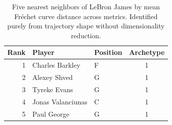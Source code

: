 \begin{table}[htbp]
  \centering\small
  \begin{tabular}{rllc}
    \toprule
    Rank & Player & Position & Archetype \\
    \midrule
    1 & Charles Barkley & F & 1 \\
    2 & Alexey Shved & G & 1 \\
    3 & Tyreke Evans & G & 1 \\
    4 & Jonas Valanciunas & C & 1 \\
    5 & Paul George & G & 1 \\
    \bottomrule
  \end{tabular}
  \caption{Five nearest neighbors of LeBron James by mean Fr\'{e}chet curve distance across metrics. Identified purely from trajectory shape without dimensionality reduction.}
  \label{tab:LeBron_James_frechet_curve_neighbors}
\end{table}

